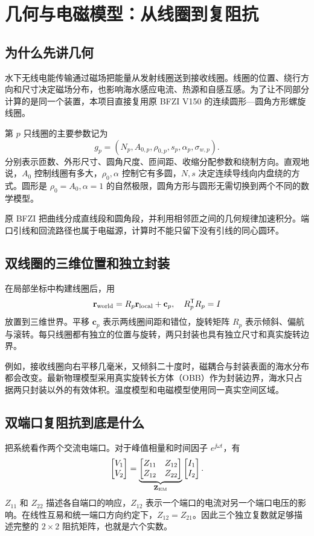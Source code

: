 \chapter{几何与电磁模型：从线圈到复阻抗}
\label{ch:em}

\section{为什么先讲几何}
水下无线电能传输通过磁场把能量从发射线圈送到接收线圈。线圈的位置、绕行方向和尺寸决定磁场分布，也影响海水感应电流、热源和自感互感。为了让不同部分计算的是同一个装置，本项目直接复用原 BFZI V150 的连续圆形—圆角方形螺旋线圈。

第 $p$ 只线圈的主要参数记为
\[
g_p=(N_p,A_{0,p},\rho_{0,p},s_p,\alpha_p,\sigma_{w,p}).
\]
分别表示匝数、外形尺寸、圆角尺度、匝间距、收缩分配参数和绕制方向。直观地说，$A_0$ 控制线圈有多大，$\rho_0,\alpha$ 控制它有多圆，$N,s$ 决定连续导线向内盘绕的方式。圆形是 $\rho_0=A_0,\alpha=1$ 的自然极限，圆角方形与圆形无需切换到两个不同的数学模型。

原 BFZI 把曲线分成直线段和圆角段，并利用相邻匝之间的几何规律加速积分。端口引线和回流路径也属于电磁源，计算时不能只留下没有引线的同心圆环。

\section{双线圈的三维位置和独立封装}
在局部坐标中构建线圈后，用
\[
\mathbf r_{\rm world}=R_p\mathbf r_{\rm local}+\mathbf c_p,\quad
R_p^\mathsf T R_p=I
\]
放置到三维世界。平移 $\mathbf c_p$ 表示两线圈间距和错位，旋转矩阵 $R_p$ 表示倾斜、偏航与滚转。每只线圈都有独立的位置与旋转，两只封装也具有独立尺寸和真实旋转边界。

例如，接收线圈向右平移几毫米，又倾斜二十度时，磁耦合与封装表面的海水分布都会改变。最新物理模型采用真实旋转长方体（OBB）作为封装边界，海水只占据两只封装以外的有效体积。温度模型和电磁模型使用同一真实空间区域。

\section{双端口复阻抗到底是什么}
把系统看作两个交流电端口。对于峰值相量和时间因子 $e^{\jj\omega t}$，有
\begin{equation}
\label{eq:port}
\begin{bmatrix}V_1\\V_2\end{bmatrix}
=\underbrace{\begin{bmatrix}Z_{11}&Z_{12}\\Z_{12}&Z_{22}\end{bmatrix}}_{\mathbf Z_{\mathrm{EM}}}
\begin{bmatrix}I_1\\I_2\end{bmatrix}.
\end{equation}
$Z_{11}$ 和 $Z_{22}$ 描述各自端口的响应，$Z_{12}$ 表示一个端口的电流对另一个端口电压的影响。在线性互易和统一端口方向约定下，$Z_{12}=Z_{21}$。因此三个独立复数就足够描述完整的 $2\times2$ 阻抗矩阵，也就是六个实数。

